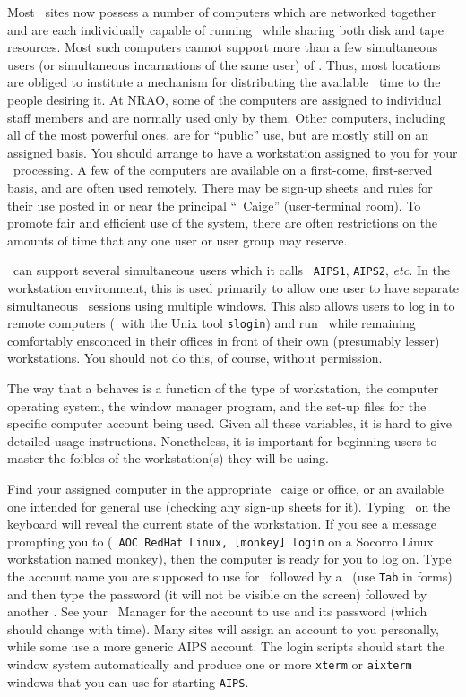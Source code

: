      Most \AIPS\ sites now possess a number of computers which are
networked together and are each individually capable of running \AIPS\
while sharing both disk and tape resources.  Most such computers
cannot support more than a few simultaneous users (or simultaneous
incarnations of the same user) of \AIPS\@.  Thus, most locations
are obliged to institute a mechanism for distributing the available
\AIPS\ time to the people desiring it.  At NRAO, some of the computers
are assigned to individual staff members and are normally used only by
them.  Other computers, including all of the most powerful ones, are
for ``public'' use, but are mostly still on an assigned basis.  You
should arrange to have a workstation assigned to you for your \AIPS\
processing.  A few of the computers are available on a first-come,
first-served basis, and are often used remotely.  There may be sign-up
sheets and rules for their use posted in or near the principal
``\AIPS\ Caige'' (user-terminal room).  To promote fair and efficient
use of the system, there are often restrictions on the amounts of time
that any one user or user group may reserve.

     \AIPS\ can support several simultaneous users which it calls {\tt
AIPS1}, {\tt AIPS2}, {\it etc.}  In the workstation environment, this
is used primarily to allow one user to have separate simultaneous
\AIPS\ sessions using multiple windows.  This also allows users to
log in to remote computers (\eg\ with the Unix tool {\tt slogin}) and
run \AIPS\ while remaining comfortably ensconced in their offices in
front of their own (presumably lesser) workstations.  You should not
do this, of course, without permission.


     The way that a  behaves is a function of the
type of workstation, the computer operating system, the window manager
program, and the set-up files for the specific computer account being
used.  Given all these variables, it is hard to give detailed usage
instructions.  Nonetheless, it is important for beginning users to
master the foibles of the workstation(s) they will be using.


    Find your assigned computer in the appropriate \AIPS\ caige or
office, or an available one intended for general use (checking any
sign-up sheets for it).  Typing \CR\ on the keyboard will reveal the
current state of the workstation.  If you see a message prompting you
to \indx{log in} (\eg\ {\tt AOC RedHat Linux, [monkey] login} on a
Socorro Linux workstation named monkey), then the computer is ready for
you to log on.  Type the account name you are supposed to use for
\AIPS\ followed by a \CR\ (use {\tt Tab} in forms) and then type the
password (it will not be visible on the screen) followed by another
\CR\@.  See your \AIPS\ Manager for the account to use and its
password (which should change with time).  Many sites will assign an
account to you personally, while some use a more generic AIPS account.
The login scripts should start the window system automatically and
produce one or more {\tt xterm} or {\tt aixterm} windows that you can
use for starting {\tt AIPS}\@.

